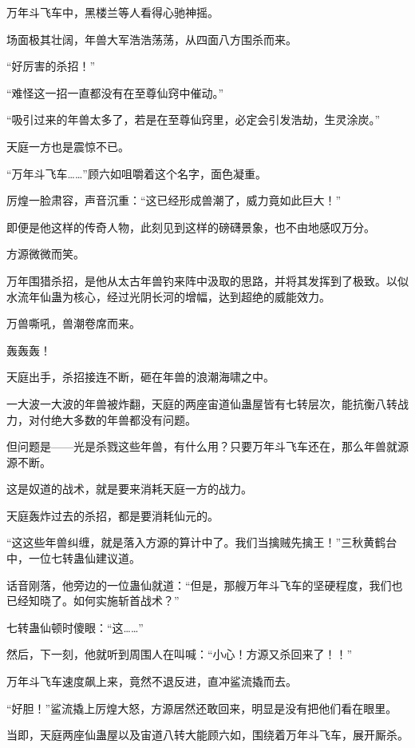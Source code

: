 
\begin{this_body}

万年斗飞车中，黑楼兰等人看得心驰神摇。

场面极其壮阔，年兽大军浩浩荡荡，从四面八方围杀而来。

“好厉害的杀招！”

“难怪这一招一直都没有在至尊仙窍中催动。”

“吸引过来的年兽太多了，若是在至尊仙窍里，必定会引发浩劫，生灵涂炭。”

天庭一方也是震惊不已。

“万年斗飞车……”顾六如咀嚼着这个名字，面色凝重。

厉煌一脸肃容，声音沉重：“这已经形成兽潮了，威力竟如此巨大！”

即便是他这样的传奇人物，此刻见到这样的磅礴景象，也不由地感叹万分。

方源微微而笑。

万年围猎杀招，是他从太古年兽钓来阵中汲取的思路，并将其发挥到了极致。以似水流年仙蛊为核心，经过光阴长河的增幅，达到超绝的威能效力。

万兽嘶吼，兽潮卷席而来。

轰轰轰！

天庭出手，杀招接连不断，砸在年兽的浪潮海啸之中。

一大波一大波的年兽被炸翻，天庭的两座宙道仙蛊屋皆有七转层次，能抗衡八转战力，对付绝大多数的年兽都没有问题。

但问题是——光是杀戮这些年兽，有什么用？只要万年斗飞车还在，那么年兽就源源不断。

这是奴道的战术，就是要来消耗天庭一方的战力。

天庭轰炸过去的杀招，都是要消耗仙元的。

“这这些年兽纠缠，就是落入方源的算计中了。我们当擒贼先擒王！”三秋黄鹤台中，一位七转蛊仙建议道。

话音刚落，他旁边的一位蛊仙就道：“但是，那艘万年斗飞车的坚硬程度，我们也已经知晓了。如何实施斩首战术？”

七转蛊仙顿时傻眼：“这……”

然后，下一刻，他就听到周围人在叫喊：“小心！方源又杀回来了！！”

万年斗飞车速度飙上来，竟然不退反进，直冲鲨流撬而去。

“好胆！”鲨流撬上厉煌大怒，方源居然还敢回来，明显是没有把他们看在眼里。

当即，天庭两座仙蛊屋以及宙道八转大能顾六如，围绕着万年斗飞车，展开厮杀。


\end{this_body}
